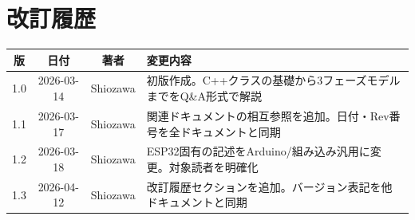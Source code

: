\section*{改訂履歴}

\begin{tabularx}{\textwidth}{c c c X}
\toprule
\textbf{版} & \textbf{日付} & \textbf{著者} & \textbf{変更内容} \\
\midrule
1.0 & 2026-03-14 & Shiozawa & 初版作成。C++クラスの基礎から3フェーズモデルまでをQ\&A形式で解説 \\
1.1 & 2026-03-17 & Shiozawa & 関連ドキュメントの相互参照を追加。日付・Rev番号を全ドキュメントと同期 \\
1.2 & 2026-03-18 & Shiozawa & ESP32固有の記述をArduino/組み込み汎用に変更。対象読者を明確化 \\
1.3 & 2026-04-12 & Shiozawa & 改訂履歴セクションを追加。バージョン表記を他ドキュメントと同期 \\
\bottomrule
\end{tabularx}
